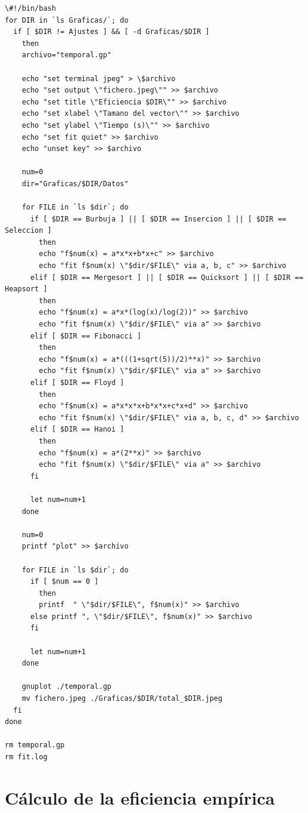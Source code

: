 \documentclass[11pt,spanish]{article} %
\begin{document}
\begin{lstlisting}[language=gnuplot]
\#!/bin/bash
for DIR in `ls Graficas/`; do
  if [ $DIR != Ajustes ] && [ -d Graficas/$DIR ]
    then
    archivo="temporal.gp"

    echo "set terminal jpeg" > \$archivo
    echo "set output \"fichero.jpeg\"" >> $archivo
    echo "set title \"Eficiencia $DIR\"" >> $archivo
    echo "set xlabel \"Tamano del vector\"" >> $archivo
    echo "set ylabel \"Tiempo (s)\"" >> $archivo
    echo "set fit quiet" >> $archivo
    echo "unset key" >> $archivo

    num=0
    dir="Graficas/$DIR/Datos"

    for FILE in `ls $dir`; do
      if [ $DIR == Burbuja ] || [ $DIR == Insercion ] || [ $DIR == Seleccion ]
        then
        echo "f$num(x) = a*x*x+b*x+c" >> $archivo
        echo "fit f$num(x) \"$dir/$FILE\" via a, b, c" >> $archivo
      elif [ $DIR == Mergesort ] || [ $DIR == Quicksort ] || [ $DIR == Heapsort ]
        then
        echo "f$num(x) = a*x*(log(x)/log(2))" >> $archivo
        echo "fit f$num(x) \"$dir/$FILE\" via a" >> $archivo
      elif [ $DIR == Fibonacci ]
        then
        echo "f$num(x) = a*(((1+sqrt(5))/2)**x)" >> $archivo
        echo "fit f$num(x) \"$dir/$FILE\" via a" >> $archivo
      elif [ $DIR == Floyd ]
        then
        echo "f$num(x) = a*x*x*x+b*x*x+c*x+d" >> $archivo
        echo "fit f$num(x) \"$dir/$FILE\" via a, b, c, d" >> $archivo
      elif [ $DIR == Hanoi ]
        then
        echo "f$num(x) = a*(2**x)" >> $archivo
        echo "fit f$num(x) \"$dir/$FILE\" via a" >> $archivo
      fi

      let num=num+1
    done

    num=0
    printf "plot" >> $archivo

    for FILE in `ls $dir`; do
      if [ $num == 0 ]
        then
        printf  " \"$dir/$FILE\", f$num(x)" >> $archivo
      else printf ", \"$dir/$FILE\", f$num(x)" >> $archivo
      fi

      let num=num+1
    done

    gnuplot ./temporal.gp
    mv fichero.jpeg ./Graficas/$DIR/total_$DIR.jpeg
  fi
done

rm temporal.gp
rm fit.log
\end{lstlisting}

\newpage

\section{C\'alculo de la eficiencia emp\'irica}
\end{document}
